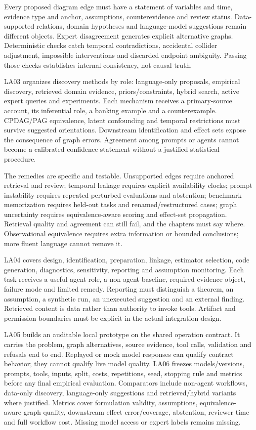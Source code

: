 \documentclass[
  11pt,
  a4paper,
]{article}
\begin{document}
Every proposed diagram edge must have a statement of variables and time,
evidence type and anchor, assumptions, counterevidence and review
status. Data-supported relations, domain hypotheses and language-model
suggestions remain different objects. Expert disagreement generates
explicit alternative graphs. Deterministic checks catch temporal
contradictions, accidental collider adjustment, impossible interventions
and discarded endpoint ambiguity. Passing those checks establishes
internal consistency, not causal truth.

LA03 organizes discovery methods by role: language-only proposals,
empirical discovery, retrieved domain evidence, priors/constraints,
hybrid search, active expert queries and experiments. Each mechanism
receives a primary-source account, its inferential role, a banking
example and a counterexample. CPDAG/PAG equivalence, latent confounding
and temporal restrictions must survive suggested orientations.
Downstream identification and effect sets expose the consequence of
graph errors. Agreement among prompts or agents cannot become a
calibrated confidence statement without a justified statistical
procedure.

The remedies are specific and testable. Unsupported edges require
anchored retrieval and review; temporal leakage requires explicit
availability clocks; prompt instability requires repeated perturbed
evaluations and abstention; benchmark memorization requires held-out
tasks and renamed/restructured cases; graph uncertainty requires
equivalence-aware scoring and effect-set propagation. Retrieval quality
and agreement can still fail, and the chapters must say where.
Observational equivalence requires extra information or bounded
conclusions; more fluent language cannot remove it.

LA04 covers design, identification, preparation, linkage, estimator
selection, code generation, diagnostics, sensitivity, reporting and
assumption monitoring. Each task receives a useful agent role, a
non-agent baseline, required evidence object, failure mode and limited
remedy. Reporting must distinguish a theorem, an assumption, a synthetic
run, an unexecuted suggestion and an external finding. Retrieved content
is data rather than authority to invoke tools. Artifact and permission
boundaries must be explicit in the actual integration design.

LA05 builds an auditable local prototype on the shared operation
contract. It carries the problem, graph alternatives, source evidence,
tool calls, validation and refusals end to end. Replayed or mock model
responses can qualify contract behavior; they cannot qualify live model
quality. LA06 freezes models/versions, prompts, tools, inputs, split,
costs, repetitions, seed, stopping rule and metrics before any final
empirical evaluation. Comparators include non-agent workflows, data-only
discovery, language-only suggestions and retrieved/hybrid variants where
justified. Metrics cover formulation validity, assumptions, equivalence-
aware graph quality, downstream effect error/coverage, abstention,
reviewer time and full workflow cost. Missing model access or expert
labels remains missing.
\end{document}
